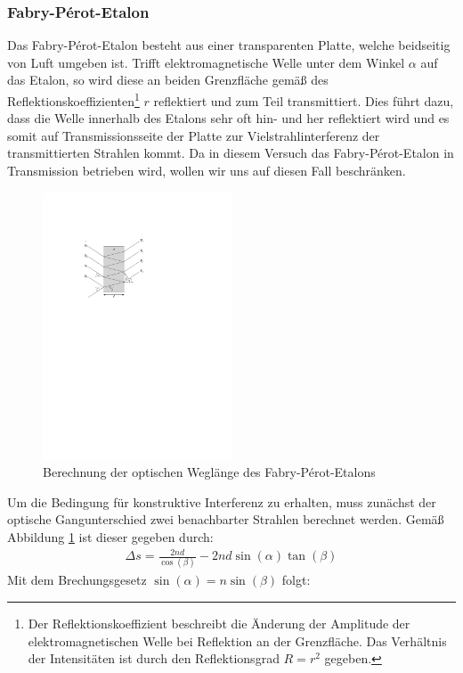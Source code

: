 \documentclass[11pt, a4paper]{article}
\begin{document}
\subsubsection{Fabry-Pérot-Etalon}
Das Fabry-Pérot-Etalon besteht aus einer transparenten Platte, welche beidseitig von Luft umgeben ist.
Trifft elektromagnetische Welle unter dem Winkel $\alpha$ auf das Etalon, so wird diese an beiden Grenzfläche gemäß des Reflektionskoeffizienten\footnote{Der Reflektionskoeffizient beschreibt die Änderung der Amplitude der elektromagnetischen Welle bei Reflektion an der Grenzfläche. Das Verhältnis der Intensitäten ist durch den Reflektionsgrad $R = r^2$ gegeben.} $r$ reflektiert und zum Teil transmittiert.
Dies führt dazu, dass die Welle innerhalb des Etalons sehr oft hin- und her reflektiert wird und es somit auf Transmissionsseite der Platte zur Vielstrahlinterferenz der transmittierten Strahlen kommt.
Da in diesem Versuch das Fabry-Pérot-Etalon in Transmission betrieben wird, wollen wir uns auf diesen Fall beschränken.
\begin{figure}[h]
	\centering
	\includegraphics[width=0.5\textwidth]{./figures/fabry_perot.pdf}
	\caption{Berechnung der optischen Weglänge des Fabry-Pérot-Etalons}
	\label{fig:fabry_perot}
\end{figure}
Um die Bedingung für konstruktive Interferenz zu erhalten, muss zunächst der optische Gangunterschied zwei benachbarter Strahlen berechnet werden.
Gemäß Abbildung \ref{fig:fabry_perot} ist dieser gegeben durch:
\begin{align}
	\Delta s = \frac{2 n d}{\cos(\beta)} - 2 n d \sin(\alpha) \tan(\beta)
\end{align}
Mit dem Brechungsgesetz $\sin(\alpha) = n \sin(\beta)$ folgt:
\end{document}
